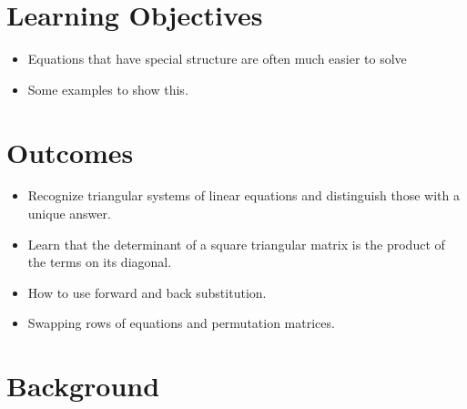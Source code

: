 \section*{Learning Objectives}

\begin{itemize}
\item Equations that have special structure are often much easier to solve
\item Some examples to show this.
\end{itemize}

\section*{Outcomes}
\begin{itemize}
\item Recognize triangular systems of linear equations and distinguish those with a unique answer.
\item Learn that the determinant of a square triangular matrix is the product of the terms on its diagonal.
    \item How to use forward and back substitution.
    \item Swapping rows of equations and permutation matrices.
\end{itemize}
\newpage

\section{Background}

